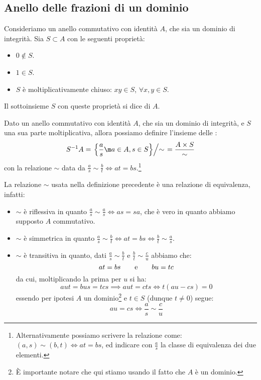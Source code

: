 \documentclass[11pt]{scrartcl}
\begin{document}
\newpage
\subsection{Anello delle frazioni di un dominio}

\begin{definition}
    Consideriamo un anello commutativo con identità $A$, che sia un dominio di integrità. Sia $S \subset A$ con le seguenti proprietà:
    \begin{itemize}
        \item $0 \not\in S$.
        \item $1 \in S$.
        \item $S$ è moltiplicativamente chiuso: $xy \in S$, $\forall x,y \in S$.
    \end{itemize}
    Il sottoinsieme $S$ con queste proprietà si dice  di $A$.
\end{definition}

\begin{definition}
    Dato un anello commutativo con identità $A$, che sia un dominio di integrità, e $S$ una sua parte moltiplicativa, allora possiamo definire l'insieme delle :
    \[ S^{-1}A = \left.\left\{\frac{a}{s} \m a\in A, s \in S\right\} \middle/ \sim \right. = \frac{A \times S}{\sim}
        \]
    con la relazione $\sim$ data da $\displaystyle\frac{a}{s} \sim \frac{b}{t} \iff at = bs$.\footnote{Alternativamente possiamo scrivere la relazione come: $(a,s) \sim (b,t) \iff at = bs$, ed indicare con $\displaystyle\frac{a}{s}$ la classe di equivalenza dei due elementi.}
\end{definition}

\begin{remark}
    La relazione $\sim$ usata nella definizione precedente è una relazione di equivalenza, infatti:
    \begin{itemize}
        \item $\sim$ è riflessiva in quanto $\displaystyle\frac{a}{s} \sim \frac{a}{s} \iff as = sa$, che è vero in quanto abbiamo supposto $A$ commutativo.
        \item $\sim$ è simmetrica in quanto $\displaystyle\frac{a}{s} \sim \frac{b}{t} \iff at = bs \iff \frac{b}{t} \sim \frac{a}{s}$.
        \item $\sim$ è transitiva in quanto, dati $\displaystyle\frac{a}{s} \sim \frac{b}{t}$ e $\displaystyle\frac{b}{t} \sim \frac{c}{u}$ abbiamo che:
            \[ at = bs \qquad \text e \qquad bu = tc
                \]
        da cui, moltiplicando la prima per $u$ si ha:
            \[ aut = bus = tcs \implies aut = cts \iff t(au-cs) = 0
                \]
        essendo per ipotesi $A$ un dominio\footnote{È importante notare che qui stiamo usando il fatto che $A$ è un dominio.} e $t \in S$ (dunque $t \ne 0$) segue:
            \[ au = cs \iff \frac{a}{s} \sim \frac{c}{u}
                \]
    \end{itemize}
\end{remark}
\end{document}
